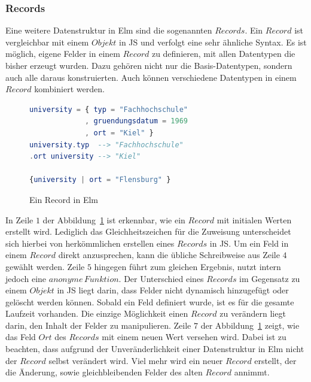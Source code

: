 \subsubsection{Records}
\label{sec:Records}
Eine weitere Datenstruktur in Elm sind die sogenannten $Records$. Ein $Record$ ist vergleichbar mit einem $Objekt$ in \ac{JS} und verfolgt eine sehr ähnliche Syntax. Es ist möglich, eigene Felder in einem $Record$ zu definieren, mit allen Datentypen die bisher erzeugt wurden. Dazu gehören nicht nur die Basis-Datentypen, sondern auch alle daraus konstruierten. Auch können verschiedene Datentypen in einem $Record$ kombiniert werden.
\begin{figure}[h]
\begin{lstlisting}[language=Elm]
university = { typ = "Fachhochschule"
             , gruendungsdatum = 1969
             , ort = "Kiel" }
university.typ  --> "Fachhochschule"
.ort university --> "Kiel"

{university | ort = "Flensburg" }
\end{lstlisting}
\caption{Ein Record in Elm}\label{fig:elm-record}
\end{figure}
In Zeile $1$ der Abbildung~\ref{fig:elm-record} ist erkennbar, wie ein $Record$ mit initialen Werten erstellt wird. Lediglich das Gleichheitszeichen für die Zuweisung unterscheidet sich hierbei von herkömmlichen erstellen eines $Records$ in \ac{JS}. Um ein Feld in einem $Record$ direkt anzusprechen, kann die übliche Schreibweise aus Zeile $4$ gewählt werden. Zeile $5$ hingegen führt zum gleichen Ergebnis, nutzt intern jedoch eine $anonyme\,Funktion$. Der Unterschied eines $Records$ im Gegensatz zu einem $Objekt$ in \ac{JS} liegt darin, dass Felder nicht dynamisch hinzugefügt oder gelöscht werden können. Sobald ein Feld definiert wurde, ist es für die gesamte Laufzeit vorhanden. Die einzige Möglichkeit einen $Record$ zu verändern liegt darin, den Inhalt der Felder zu manipulieren. Zeile $7$ der Abbildung~\ref{fig:elm-record} zeigt, wie das Feld $Ort$ des $Records$ mit einem neuen Wert versehen wird. Dabei ist zu beachten, dass aufgrund der Unveränderlichkeit einer Datenstruktur in Elm nicht der $Record$ selbst verändert wird. Viel mehr wird ein neuer $Record$ erstellt, der die Änderung, sowie gleichbleibenden Felder des alten $Record$ annimmt.

